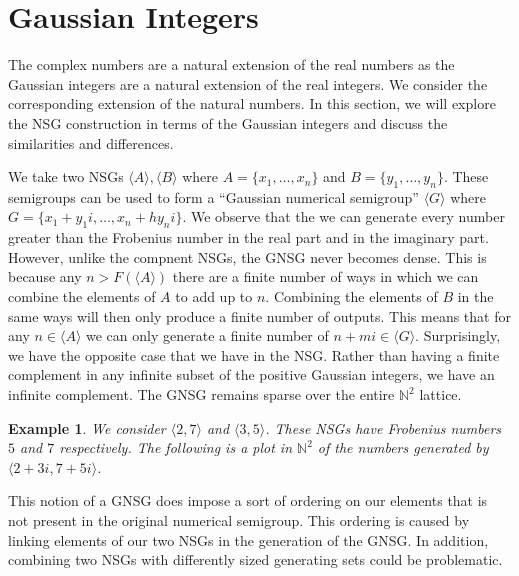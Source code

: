 \documentclass[11pt]{amsart}
\theoremstyle{plain}
\newtheorem{exa}{Example}
\theoremstyle{definition}
\begin{document}
\section{Gaussian Integers}
The complex numbers are a natural extension of the real numbers as the Gaussian integers are a natural extension of the real integers. We consider the corresponding extension of the natural numbers. In this section, we will explore the NSG construction in terms of the Gaussian integers and discuss the similarities and differences.

We take two NSGs $\langle A\rangle, \langle B\rangle$ where $A=\{x_1,\dots,x_n\}$ and $B=\{y_1,\dots,y_n\}$.
These semigroups can be used to form a ``Gaussian numerical semigroup'' $\langle G\rangle$ where $G=\{x_1+y_1i,\dots,x_n+hy_ni\}$.
We observe that the we can generate every number greater than the Frobenius number in the real part and in the imaginary part.
However, unlike the compnent NSGs, the GNSG never becomes dense.
This is because any $n>F(\langle A\rangle)$ there are a finite number of ways in which we can combine the elements of $A$ to add up to $n$.
Combining the elements of $B$ in the same ways will then only produce a finite number of outputs.
This means that for any $n\in \langle A\rangle$ we can only generate a finite number of $n+mi\in \langle G\rangle$.
Surprisingly, we have the opposite case that we have in the NSG.
Rather than having a finite complement in any infinite subset of the positive Gaussian integers, we have an infinite complement.
The GNSG remains sparse over the entire $\mathbb{N}^2$ lattice.

\begin{exa}
We consider $\langle 2,7\rangle$ and $\langle 3,5\rangle$. These NSGs have Frobenius numbers $5$ and $7$ respectively\cite{frobmask}. The following is a plot in $\mathbb{N}^2$ of the numbers generated by $\langle 2+3i,7+5i\rangle$.

\begin{center}
\end{center}
\end{exa}
This notion of a GNSG does impose a sort of ordering on our elements that is not present in the original numerical semigroup. This ordering is caused by linking elements of our two NSGs in the generation of the GNSG. In addition, combining two NSGs with differently sized generating sets could be problematic.
\end{document}
